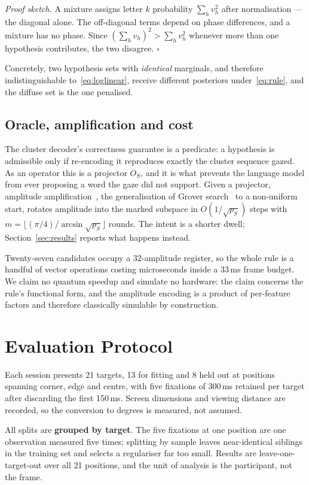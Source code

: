 \documentclass[conference]{IEEEtran}
\begin{document}
\noindent\emph{Proof sketch.} A mixture assigns letter $k$ probability
$\sum_h v_h^{2}$ after normalisation --- the diagonal alone. The off-diagonal
terms depend on phase differences, and a mixture has no phase. Since
$(\sum_h v_h)^{2} > \sum_h v_h^{2}$ whenever more than one hypothesis
contributes, the two disagree. $\square$

Concretely, two hypothesis sets with \emph{identical} marginals, and therefore
indistinguishable to~\eqref{eq:loglinear}, receive different posteriors
under~\eqref{eq:rule}, and the diffuse set is the one penalised.

\subsection{Oracle, amplification and cost}

The cluster decoder's correctness guarantee is a predicate: a hypothesis is
admissible only if re-encoding it reproduces exactly the cluster sequence
gazed. As an operator this is a projector $O_S$, and it is what prevents the
language model from ever proposing a word the gaze did not support. Given a
projector, amplitude amplification~\cite{ref13}, the generalisation of Grover
search~\cite{ref14} to a non-uniform start, rotates amplitude into the marked
subspace in $O(1/\sqrt{p_S})$ steps with
$m = \lfloor(\pi/4)/\arcsin\sqrt{p_S}\rfloor$ rounds. The intent is a shorter
dwell; Section~\ref{sec:results} reports what happens instead.

Twenty-seven candidates occupy a $32$-amplitude register, so the whole rule is a
handful of vector operations costing microseconds inside a $33$\,ms frame
budget. We claim no quantum speedup and simulate no hardware: the claim concerns
the rule's functional form, and the amplitude encoding is a product of
per-feature factors and therefore classically simulable by construction.

\section{Evaluation Protocol}
\label{sec:protocol}

Each session presents 21 targets, 13 for fitting and 8 held out at positions
spanning corner, edge and centre, with five fixations of 300\,ms retained per
target after discarding the first 150\,ms. Screen dimensions and viewing
distance are recorded, so the conversion to degrees is measured, not assumed.

All splits are \textbf{grouped by target}. The five fixations at one position
are one observation measured five times; splitting by sample leaves
near-identical siblings in the training set and selects a regulariser far too
small. Results are leave-one-target-out over all 21 positions, and the unit of
analysis is the participant, not the frame.
\end{document}
